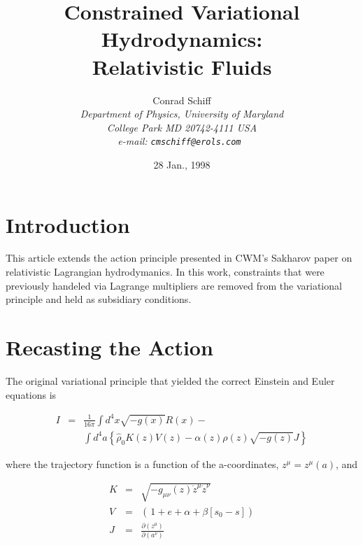 


\title{Constrained Variational Hydrodynamics: \\ Relativistic Fluids}
%
\author{   \sc
            Conrad Schiff\\
           \em
            Department of Physics, University of Maryland%
           \\ \em
            College Park MD 20742-4111 USA\\
           \rm
         e-mail: \tt cmschiff@erols.com
        }
\date{28 Jan., 1998}
% 
\maketitle

\section{Introduction}

This article extends the action principle presented in CWM's Sakharov paper on relativistic Lagrangian hydrodymanics.  In this work, constraints that were previously handeled via Lagrange multipliers are removed from the variational principle and held as subsidiary conditions.

\section{Recasting the Action}

The original variational principle that yielded the correct Einstein and Euler equations is

\begin{eqnarray}
I &=& \frac{1}{16\pi} \int d^4x \sqrt{-g(x)} R(x) - \nonumber \\
& & \int d^4a \left\{ {\hat \rho}_{0} K(z) V(z) - \alpha(z) \rho(z) \sqrt{-g(z)} J\right\}
\end{eqnarray}

where the trajectory function is a function of the a-coordinates, $z^{\mu} =  z^{\mu}(a)$, and 

\begin{eqnarray}
K &=& \sqrt{ -g_{\mu\nu}(z) {\dot z}^{\mu} {\dot z}^{\nu} } \nonumber \\
V &=& \left( \frac{}{} 1 + e + \alpha + \beta \left[ s_{0} - s \right] \right) \nonumber \\
J &=& \frac{\partial\left(z^{\mu}\right)}{\partial\left(a^{\nu}\right)}\nonumber
\end{eqnarray}

